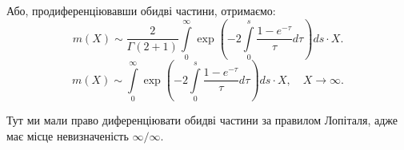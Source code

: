Або, продиференціювавши обидві частини,  отримаємо:
\begin{equation}
	m(X) \sim \frac{2}{\Gamma(2 + 1)} \int\limits_0^\infty \exp\left( -2\int\limits_0^s \frac{1 - e^{-\tau}}{\tau} d\tau  \right) ds \cdot X.
\end{equation}
\begin{equation}
	\label{eq:uniform_base_final}
	m(X) \sim  \int\limits_0^\infty \exp\left( -2\int\limits_0^s \frac{1 - e^{-\tau}}{\tau} d\tau  \right) ds \cdot X, \quad X \rightarrow \infty.
\end{equation}

Тут ми мали право диференціювати обидві частини за правилом Лопіталя, адже має місце невизначеність $\infty / \infty$.


